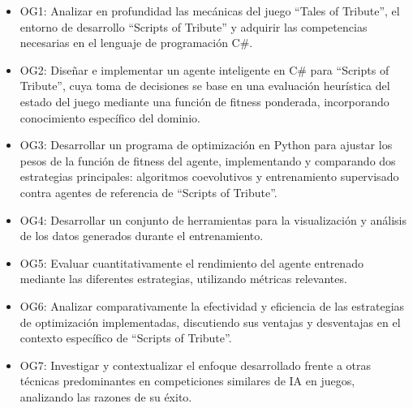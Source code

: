 \begin{itemize}
	\item OG1: Analizar en profundidad las mecánicas del juego ``Tales of Tribute'', el entorno de desarrollo ``Scripts of Tribute'' y adquirir las competencias necesarias en el lenguaje de programación C\#.
	\item OG2: Diseñar e implementar un agente inteligente en C\# para ``Scripts of Tribute'', cuya toma de decisiones se base en una evaluación heurística del estado del juego mediante una función de fitness ponderada, incorporando conocimiento específico del dominio.
	\item OG3: Desarrollar un programa de optimización en Python para ajustar los pesos de la función de fitness del agente, implementando y comparando dos estrategias principales: algoritmos coevolutivos y entrenamiento supervisado contra agentes de referencia de ``Scripts of Tribute''.
	\item OG4: Desarrollar un conjunto de herramientas para la visualización y análisis de los datos generados durante el entrenamiento.
	\item OG5: Evaluar cuantitativamente el rendimiento del agente entrenado mediante las diferentes estrategias, utilizando métricas relevantes.
	\item OG6: Analizar comparativamente la efectividad y eficiencia de las estrategias de optimización implementadas, discutiendo sus ventajas y desventajas en el contexto específico de ``Scripts of Tribute''.
	\item OG7: Investigar y contextualizar el enfoque desarrollado frente a otras técnicas predominantes en competiciones similares de IA en juegos, analizando las razones de su éxito.
\end{itemize}